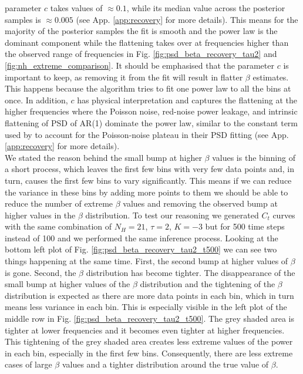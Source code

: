 \documentclass{aa}
\begin{document}
parameter $c$ takes values of $\approx 0.1$, while its median value across the posterior
samples is $\approx 0.005$ (see App. \ref{app:recovery} for more details). This means for the majority of the posterior samples the fit is smooth and the power law is the dominant component while the flattening takes over at frequencies higher than the observed range of frequencies in Fig. \ref{fig:psd_beta_recovery_tau2} and \ref{fig:nh_extreme_comparison}. It should be emphasised that the parameter $c$ is important to keep, as removing it from the fit will result in flatter $\beta$ estimates. This happens because the algorithm tries to fit one power law to all the bins at once. In addition, $c$ has physical interpretation and captures the flattening at the higher frequencies where the Poisson noise, red-noise power leakage, and intrinsic flattening of PSD of AR(1) dominate the power law, similar to the constant term used by \citet{Alston2019} to account for the Poisson-noise plateau in their PSD fitting (see App. \ref{app:recovery} for more details). \\
We stated the reason behind the small bump at higher $\beta$ values is the binning of a short process, which leaves the first few bins with very few data points and, in turn, causes the first few bins to vary significantly. This means if we can reduce the variance in these bins by adding more points to them we should be able to reduce the number of extreme $\beta$ values and removing the observed bump at higher values in the $\beta$ distribution. To test our reasoning we generated $C_t$ curves with the same combination of $N_H = 21$, $\tau = 2$, $K = -3$ but for 500 time steps instead of 100 and we performed the same inference process. Looking at the bottom left plot of Fig. \ref{fig:psd_beta_recovery_tau2_t500} we can see two things happening at the same time. First, the second bump at higher values of $\beta$ is gone. Second, the $\beta$ distribution has become tighter. The disappearance of the small bump at higher values of the $\beta$ distribution and the tightening of the $\beta$ distribution is expected as there are more data points in each bin, which in turn means less variance in each bin. This is especially visible in the left plot of the middle row in Fig. \ref{fig:psd_beta_recovery_tau2_t500}. The grey shaded area is tighter at lower frequencies and it becomes even tighter at higher frequencies. This tightening of the grey shaded area creates less extreme values of the power in each bin, especially in the first few bins. Consequently, there are less extreme cases of large $\beta$ values and a tighter distribution around the true value of $\beta$. \\
\end{document}
